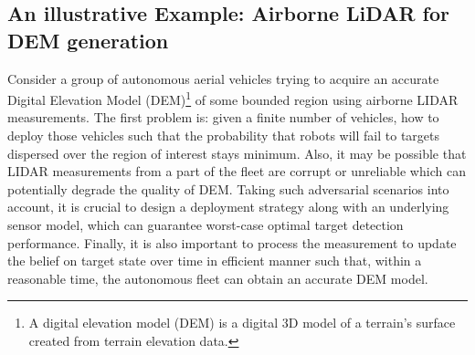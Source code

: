 \documentclass[letterpaper, 10 pt, conference]{ieeeconf}
\begin{document}
\subsection{An illustrative Example: Airborne LiDAR for DEM generation}
\label{sec:sec22}
Consider a group of autonomous aerial vehicles trying to acquire an accurate Digital Elevation Model (DEM)\footnote{A digital elevation model (DEM) is a digital 3D model of a terrain's surface created from terrain elevation data.} of some bounded region using airborne LIDAR measurements.
The first problem is: given a finite number of vehicles, how to deploy those vehicles such that the probability that robots will fail to targets dispersed over the region of interest stays minimum. Also, it may be possible that LIDAR measurements from a part of the fleet are corrupt or unreliable which can potentially degrade the quality of DEM. Taking such adversarial scenarios into account, it is crucial to design a deployment strategy along with an underlying sensor model, which can guarantee worst-case optimal target detection performance. 
Finally, it is also important to process the measurement to update the belief on target state over time in efficient manner such that, within a reasonable time, the autonomous fleet can obtain an accurate DEM model.
\end{document}
